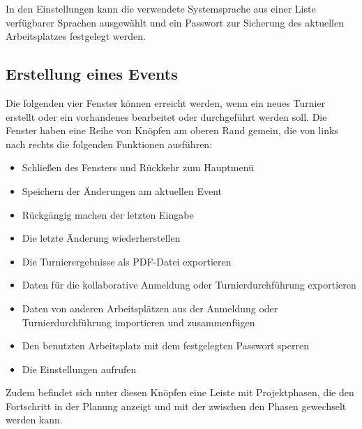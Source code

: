 \documentclass[11pt]{article}
\begin{document}
\vspace{1cm}

In den Einstellungen kann die verwendete Systemsprache aus einer Liste verfügbarer Sprachen ausgewählt und ein Passwort zur Sicherung des aktuellen Arbeitsplatzes festgelegt werden.

\subsection{Erstellung eines Events}


\vspace{1cm}

Die folgenden vier Fenster können erreicht werden, wenn ein neues Turnier erstellt oder ein vorhandenes bearbeitet oder durchgeführt werden soll. Die Fenster haben eine Reihe von Knöpfen am oberen Rand gemein, die von links nach rechts die folgenden Funktionen ausführen:
\newpage
\begin{itemize}
	\item Schließen des Fensters und Rückkehr zum Hauptmenü
	\item Speichern der Änderungen am aktuellen Event
	\item Rückgängig machen der letzten Eingabe
	\item Die letzte Änderung wiederherstellen
	\item Die Turnierergebnisse als PDF-Datei exportieren
	\item Daten für die kollaborative Anmeldung oder Turnierdurchführung exportieren
	\item Daten von anderen Arbeitsplätzen aus der Anmeldung oder Turnierdurchführung importieren und zusammenfügen
	\item Den benutzten Arbeitsplatz mit dem festgelegten Passwort sperren
	\item Die Einstellungen aufrufen
\end{itemize}
Zudem befindet sich unter diesen Knöpfen eine Leiste mit Projektphasen, die den Fortschritt in der Planung anzeigt und mit der zwischen den Phasen gewechselt werden kann.
\end{document}
